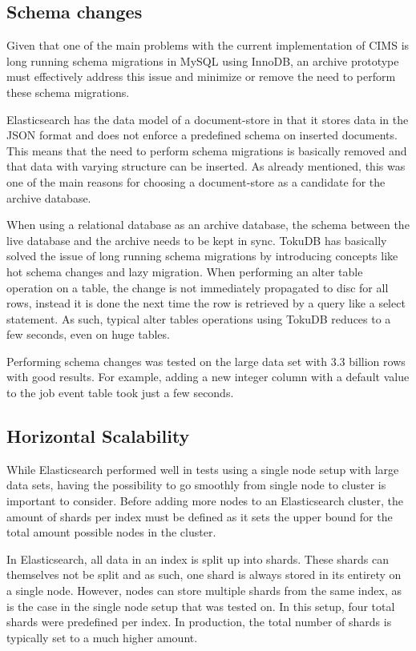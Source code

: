 \subsection{Schema changes}
Given that one of the main problems with the current implementation of CIMS is long running schema migrations in MySQL using InnoDB, an archive prototype must effectively address this issue and minimize or remove the need to perform these schema migrations.

Elasticsearch has the data model of a document-store in that it stores data in the JSON format and does not enforce a predefined schema on inserted documents. This means that the need to perform schema migrations is basically removed and that data with varying structure can be inserted. As already mentioned, this was one of the main reasons for choosing a document-store as a candidate for the archive database.

When using a relational database as an archive database, the schema between the live database and the archive needs to be kept in sync. TokuDB has basically solved the issue of long running schema migrations by introducing concepts like hot schema changes and lazy migration. When performing an alter table operation on a table, the change is not immediately propagated to disc for all rows, instead it is done the next time the row is retrieved by a query like a select statement. As such, typical alter tables operations using TokuDB reduces to a few seconds, even on huge tables.

Performing schema changes was tested on the large data set with 3.3 billion rows with good results. For example, adding a new integer column with a default value to the job event table took just a few seconds.

\subsection{Horizontal Scalability}
While Elasticsearch performed well in tests using a single node setup with large data sets, having the possibility to go smoothly from single node to cluster is important to consider. Before adding more nodes to an Elasticsearch cluster, the amount of shards per index must be defined as it sets the upper bound for the total amount possible nodes in the cluster.

In Elasticsearch, all data in an index is split up into shards. These shards can themselves not be split and as such, one shard is always stored in its entirety on a single node. However, nodes can store multiple shards from the same index, as is the case in the single node setup that was tested on. In this setup, four total shards were predefined per index. In production, the total number of shards is typically set to a much higher amount. 

